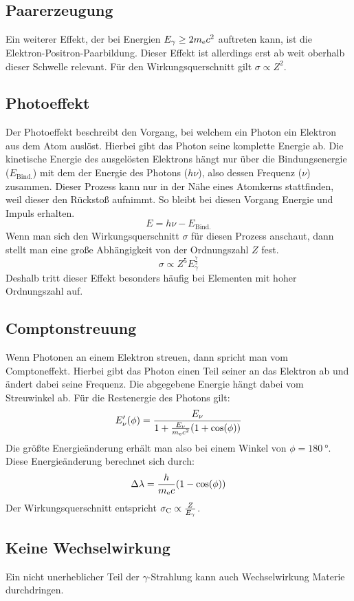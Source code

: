 \documentclass[11pt, ngerman, fleqn, DIV=15, headinclude, BCOR=2cm]{scrreprt}
\begin{document}
\subsection{Paarerzeugung}
Ein weiterer Effekt, der bei Energien $E_\gamma \ge 2m_\text ec^2$ auftreten
kann, ist die Elektron-Positron-Paarbildung.
Dieser Effekt ist allerdings erst ab weit oberhalb dieser Schwelle relevant.
Für den Wirkungsquerschnitt gilt $\sigma \propto Z^2$.

\subsection{Photoeffekt}
Der Photoeffekt beschreibt den Vorgang, bei welchem ein Photon ein Elektron aus
dem Atom auslöst.
Hierbei gibt das Photon seine komplette Energie ab.
Die kinetische Energie des ausgelösten Elektrons hängt nur über die
Bindungsenergie ($E_\text{Bind.}$) mit dem der Energie des Photons ($h\nu$),
also dessen Frequenz ($\nu$) zusammen.
Dieser Prozess kann nur in der Nähe eines Atomkerns stattfinden, weil dieser
den Rückstoß aufnimmt.
So bleibt bei diesen Vorgang Energie und Impuls erhalten. 
\[ 
    E = h\nu - E_\text{Bind.}
\]
Wenn man sich den Wirkungsquerschnitt $\sigma$ für diesen Prozess anschaut,
dann stellt man eine große Abhängigkeit von der Ordnungszahl $Z$ fest.
\[
    \sigma \propto Z^5 E_\gamma^{\frac 72}
\]
Deshalb tritt dieser Effekt besonders häufig bei Elementen mit hoher Ordnungszahl
auf.
 
\subsection{Comptonstreuung}
Wenn Photonen an einem Elektron streuen, dann spricht man vom Comptoneffekt. 
Hierbei gibt das Photon einen Teil seiner an das Elektron ab und ändert dabei
seine Frequenz.%
Die abgegebene Energie hängt dabei vom Streuwinkel ab.
Für die Restenergie des Photons gilt:
\[
    E_\nu'(\phi) = \frac{E_\nu}{1+\frac{E_\nu}{m_\text ec^2}(1+\cos(\phi))}
\]
Die größte Energieänderung erhält man also bei einem Winkel von
$\phi=\SI{180}{\degree}$.
Diese Energieänderung berechnet sich durch:
\[
    \Delta\lambda = \frac{h}{m_\text ec}(1-\cos(\phi))
\]
Der Wirkungsquerschnitt entspricht $\sigma_\text C \propto \frac{Z}{E_\gamma}$.

\subsection{Keine Wechselwirkung}
Ein nicht unerheblicher Teil der $\gamma$-Strahlung kann auch Wechselwirkung
Materie durchdringen.
\end{document}
